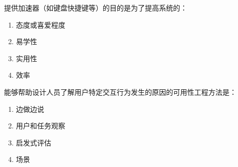 \begin{problem}
	提供加速器（如键盘快捷键等）的目的是为了提高系统的：
    \vspace{-0.8em}
    \begin{multicols}{4}
        \begin{enumerate}[label=\Alph*.]
            \item 态度或喜爱程度
            \item 易学性
            \item 实用性
            \item 效率
        \end{enumerate}
    \end{multicols}
    \vspace{-1em}
\end{problem}



\begin{problem}
	能够帮助设计人员了解用户特定交互行为发生的原因的可用性工程方法是：  
    \vspace{-0.8em}
    \begin{multicols}{4}
        \begin{enumerate}[label=\Alph*.]
            \item 边做边说
            \item 用户和任务观察
            \item 启发式评估
            \item 场景
        \end{enumerate}
    \end{multicols}
    \vspace{-1em}
\end{problem}

